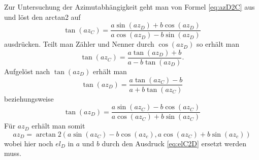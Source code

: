 Zur Untersuchung der Azimutabhängigkeit geht man von Formel \ref{eq:azD2C} aus und löst den arctan2 auf
\begin{equation}
\tan\left(az_C\right)=\frac{a\sin\left(az_D\right)+b\cos\left(az_D\right)}{a\cos\left(az_D\right)-b\sin\left(az_D\right)}
\end{equation}
ausdrücken. Teilt man Zähler und Nenner durch $\cos\left(az_D\right)$ so erhält man
\begin{equation}
\tan\left(az_C\right)=\frac{a\tan\left(az_D\right)+b}{a-b\tan\left(az_D\right)}.
\end{equation}
Aufgelöst nach $\tan\left(az_D\right)$ erhält man
\begin{equation}
\tan\left(az_D\right)=\frac{a\tan\left(az_C\right)-b}{a+b\tan\left(az_C\right)}
\end{equation}
beziehungsweise
\begin{equation}
\tan\left(az_D\right)=\frac{a\sin\left(az_C\right)-b\cos\left(az_C\right)}{a\cos\left(az_C\right)+b\sin\left(az_C\right)}
\end{equation}
Für $az_D$ erhält man somit 
\begin{equation}
az_D=\arctan 2\left(
a\sin\left(az_C\right)-b\cos\left(az_c\right),a\cos\left(az_C\right)+b\sin\left(az_c\right)\right)
\label{eq:azC2D}
\end{equation}
wobei hier noch $el_D$ in $a$ und $b$ durch den Ausdruck \ref{eq:elC2D} ersetzt werden muss.

